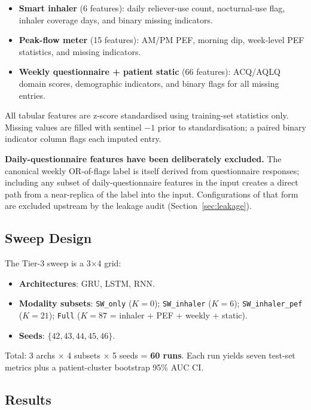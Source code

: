 \documentclass[11pt,a4paper]{article}
\begin{document}
\begin{itemize}[nosep]
  \item \textbf{Smart inhaler} (6 features): daily reliever-use count,
        nocturnal-use flag, inhaler coverage days, and binary missing
        indicators.
  \item \textbf{Peak-flow meter} (15 features): AM/PM PEF, morning dip,
        week-level PEF statistics, and missing indicators.
  \item \textbf{Weekly questionnaire + patient static} (66 features):
        ACQ/AQLQ domain scores, demographic indicators, and binary flags
        for all missing entries.
\end{itemize}

All tabular features are z-score standardised using training-set
statistics only.  Missing values are filled with sentinel $-1$ prior to
standardisation; a paired binary indicator column flags each imputed
entry.

\textbf{Daily-questionnaire features have been deliberately excluded.}
The canonical weekly OR-of-flags label is itself derived from
questionnaire responses; including any subset of daily-questionnaire
features in the input creates a direct path from a near-replica of the
label into the input.  Configurations of that form are excluded
upstream by the leakage audit
(Section~\ref{sec:leakage}).

\subsection{Sweep Design}

The Tier-3 sweep is a 3$\times$4 grid:

\begin{itemize}[nosep]
  \item \textbf{Architectures}: GRU, LSTM, RNN.
  \item \textbf{Modality subsets}: \texttt{SW\_only} ($K{=}0$);
        \texttt{SW\_inhaler} ($K{=}6$); \texttt{SW\_inhaler\_pef}
        ($K{=}21$); \texttt{Full} ($K{=}87$ = inhaler + PEF + weekly +
        static).
  \item \textbf{Seeds}: $\{42, 43, 44, 45, 46\}$.
\end{itemize}

Total: 3 archs $\times$ 4 subsets $\times$ 5 seeds = \textbf{60 runs}.
Each run yields seven test-set metrics plus a patient-cluster bootstrap
95\% AUC CI.

\subsection{Results}
\end{document}
